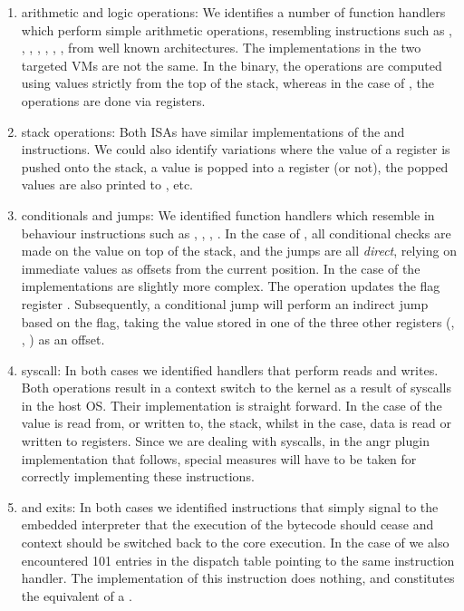 \begin{enumerate}
    \item arithmetic and logic operations: We identifies a number of function handlers which perform simple arithmetic operations, resembling instructions such as , , , , , , , from well known architectures. The implementations in the two targeted \glspl{VM} are not the same. In the  binary, the operations are computed using values strictly from the top of the stack, whereas in the case of , the operations are done via registers.
    \item stack operations: Both \glspl{ISA} have similar implementations of the  and  instructions. We could also identify variations where the value of a register is pushed onto the stack, a value is popped into a register (or not), the popped values are also printed to , etc.
    \item conditionals and jumps: We identified function handlers which resemble in behaviour instructions such as , , , . In the case of , all conditional checks are made on the value on top of the stack, and the jumps are all \emph{direct}, relying on immediate values as offsets from the current position. In the case of  the implementations are slightly more complex. The  operation updates the flag register . Subsequently, a conditional jump will perform an indirect jump based on the  flag, taking the value stored in one of the three other registers  (, , ) as an offset.
    \item \gls{syscall}: In both cases we identified handlers that perform reads and writes. Both operations result in a context switch to the kernel as a result of \glspl{syscall} in the host \gls{OS}. Their implementation is straight forward. In the case of  the value is read from, or written to, the stack, whilst in the  case, data is read or written to registers. Since we are dealing with \glspl{syscall}, in the angr plugin implementation that follows, special measures will have to be taken for correctly implementing these instructions.
    \item {} and exits: In both cases we identified  instructions that simply signal to the embedded interpreter that the execution of the bytecode should cease and context should be switched back to the core execution. In the case of  we also encountered 101 entries in the dispatch table pointing to the same instruction handler. The implementation of this instruction does nothing, and constitutes the equivalent of a .

\end{enumerate}
